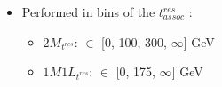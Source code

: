 {{        \vspace{-0.1cm}
        \begin{itemize}
          \footnotesize
        \item Performed in bins of the $t^{res}_{assoc}$ \pT:
          \begin{itemize}
            \footnotesize
          \item $2M_{t^{res}}$: \pT $\in$ [0, 100, 300, $\infty$] GeV
          \item $1M1L_{t^{res}}$: \pT $\in$ [0, 175, $\infty$] GeV 
          \end{itemize}          
        \end{itemize}        
      }
      {

        \vspace{-1.6cm}
        
      }
}

